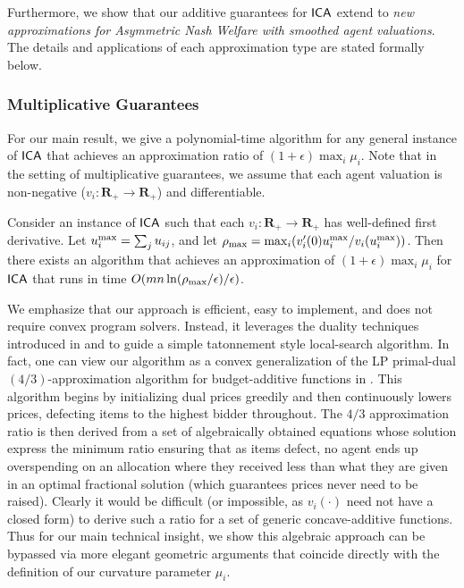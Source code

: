 Furthermore, we show that our additive guarantees for $\mathsf{ICA}$ extend to {\em new approximations for Asymmetric Nash Welfare with smoothed agent valuations}. The details and applications of each approximation type are stated formally below.



\subsubsection{Multiplicative Guarantees} 
\label{subsub:mult-guar}
For our main result, we give a  polynomial-time algorithm for any general instance of $\mathsf{ICA}$ that achieves an approximation ratio of $(1+\epsilon)\max_{i}\mu_i$.
Note that in the setting of multiplicative guarantees, we assume that each agent valuation is non-negative ($v_i:{\mathbf R}_+\rightarrow{\mathbf R}_+$) and differentiable.

\begin{theorem} 
\label{thm:pd-alg}
Consider an instance of $\mathsf{ICA}$ such that each $v_i:{\mathbf R}_+ \rightarrow {\mathbf R}_+$ has well-defined first derivative.  
Let $u_i^{\max} = \sum_j u_{ij}$, and let $\rho_{\max} = \max_i(v_i'(0)u_i^{\max}/v_i(u_i^{\max}))$. Then there exists an algorithm that achieves an approximation of  $(1+\epsilon)\max_{i}\mu_i$ for $\mathsf{ICA}$ that runs in time $O(mn\ln(\rho_{\max}/\epsilon)/\epsilon)$.
\end{theorem}

We emphasize that our approach is efficient, easy to implement, and does not require  convex program solvers. Instead, it leverages the duality techniques introduced  in \cite{chakrabarty2010approximability} and \cite{devanur2012online} to guide a simple tatonnement style local-search algorithm. 
In fact, one can view our algorithm
as a convex generalization of the LP primal-dual $(4/3)$-approximation algorithm for budget-additive functions in \cite{chakrabarty2010approximability}. This algorithm begins by initializing dual prices greedily and then continuously lowers prices, defecting items to the highest bidder throughout. 
The $4/3$ approximation ratio is then derived from a set of algebraically obtained equations whose solution express the minimum ratio ensuring that as items defect, no agent ends up overspending on an allocation where they received less than what they are given in an optimal fractional solution (which guarantees prices never need to be raised). Clearly  it would be difficult (or impossible, as $v_i(\cdot)$ need not have a closed form)  to derive such a ratio for a set of generic concave-additive functions. Thus for our main technical insight, we show this algebraic approach can be bypassed via more elegant geometric arguments that coincide  directly with the definition of our curvature parameter $\mu_i$.





